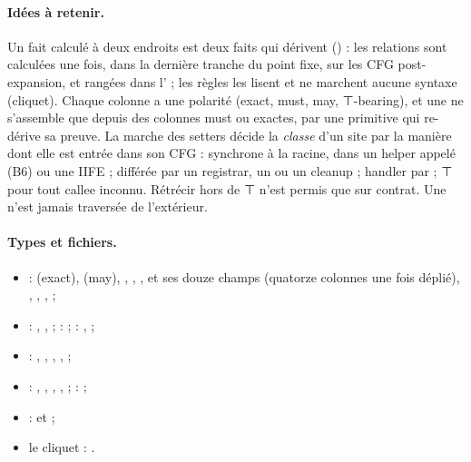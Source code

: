 \begin{resume}
\paragraph{Idées à retenir.} Un fait calculé à deux endroits est deux faits qui dérivent () : les relations sont calculées une fois, dans la dernière tranche du point fixe, sur les CFG post-expansion, et rangées dans l' ; les règles les lisent et ne marchent aucune syntaxe (cliquet). Chaque colonne a une polarité (exact, must, may, ⊤-bearing), et une \Error{} ne s'assemble que depuis des colonnes must ou exactes, par une primitive  qui re-dérive sa preuve. La marche des setters décide la \emph{classe} d'un site par la manière dont elle est entrée dans son CFG : synchrone à la racine, dans un helper appelé (B6) ou une IIFE ; différée par un registrar, un  ou un cleanup ; handler par  ; ⊤ pour tout callee inconnu. Rétrécir hors de ⊤ n'est permis que sur contrat. Une  n'est jamais traversée de l'extérieur.

\paragraph{Types et fichiers.}
\begin{itemize}
  \item {} :  (exact),  (may), , , ,  et ses douze champs (quatorze colonnes une fois  déplié), , , ,  ;
  \item {} : , ,  ;  :  ;  : ,  ;
  \item {} : , , , ,  ;
  \item {} : , , , ,  ;  :  ;
  \item {} :  et  ;
  \item le cliquet : .
\end{itemize}


\end{resume}
